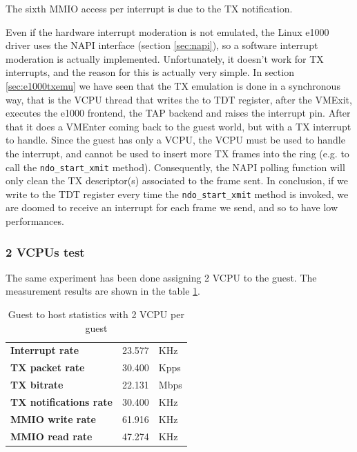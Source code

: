 The sixth MMIO access per interrupt is due to the TX notification.

Even if the hardware interrupt moderation is not emulated, the Linux e1000 driver uses the NAPI interface (section \ref{sec:napi}), so 
a software interrupt
moderation is actually implemented. Unfortunately, it doesn't work for TX interrupts, and the reason for this is actually very simple.
In section \ref{sec:e1000txemu} we have seen that the TX emulation is done in a synchronous way, that is the VCPU thread that writes
the to TDT register, after the VMExit, executes the e1000 frontend, the TAP backend and raises the interrupt pin. After that
it does a VMEnter coming back to the guest world, but with a TX interrupt to handle. Since the guest
has only a VCPU, the VCPU must be used to handle the interrupt, and cannot be used to insert more TX frames into the ring (e.g. to call
the \texttt{ndo\_start\_xmit} method). Consequently, the NAPI polling function will only clean the TX descriptor(s) associated to the
frame sent.
In conclusion, if we write to the TDT register every time the \texttt{ndo\_start\_xmit} method is invoked, we are doomed to receive
an interrupt for each frame we send, and so to have low performances.


\subsubsection{2 VCPUs test}
The same experiment has been done assigning 2 VCPU to the guest. The measurement results are shown in the table \ref{tab:e1000-tx-g2h2vcpu}.

\begin{table}
\begin{center}
\begin{tabular}{lrl}
\toprule
\textbf{Interrupt rate} & 23.577 & KHz\\
\textbf{TX packet rate} & 30.400 & Kpps\\
\textbf{TX bitrate} & 22.131 & Mbps\\
\textbf{TX notifications rate} & 30.400 & KHz\\
\textbf{MMIO write rate} & 61.916 & KHz\\
\textbf{MMIO read rate} & 47.274 & KHz\\
\bottomrule
\end{tabular}
\end{center}
\caption{Guest to host statistics with 2 VCPU per guest}
\label{tab:e1000-tx-g2h2vcpu}
\end{table}

